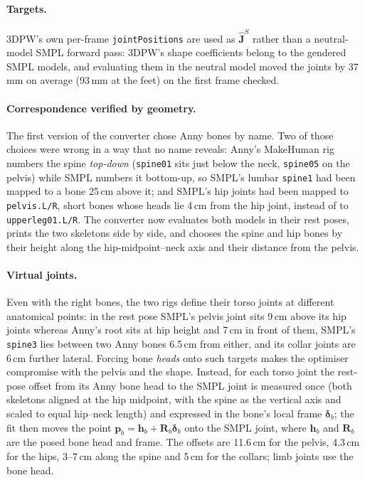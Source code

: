 \paragraph{Targets.} 3DPW's own per-frame \texttt{jointPositions} are used
as $\hat{\mathbf{J}}^{S}$ rather than a neutral-model SMPL forward pass:
3DPW's shape coefficients belong to the gendered SMPL models, and evaluating
them in the neutral model moved the joints by 37\,mm on average (93\,mm at the
feet) on the first frame checked.

\paragraph{Correspondence verified by geometry.} The first version of the
converter chose Anny bones by name. Two of those choices were wrong in a way
that no name reveals: Anny's MakeHuman rig numbers the spine \emph{top-down}
(\texttt{spine01} sits just below the neck, \texttt{spine05} on the pelvis)
while SMPL numbers it bottom-up, so SMPL's lumbar \texttt{spine1} had been
mapped to a bone 25\,cm above it; and SMPL's hip joints had been mapped to
\texttt{pelvis.L/R}, short bones whose heads lie 4\,cm from the hip joint,
instead of to \texttt{upperleg01.L/R}. The converter now evaluates both
models in their rest poses, prints the two skeletons side by side, and
chooses the spine and hip bones by their height along the hip-midpoint--neck
axis and their distance from the pelvis.

\paragraph{Virtual joints.} Even with the right bones, the two rigs define
their torso joints at different anatomical points: in the rest pose SMPL's
pelvis joint sits 9\,cm above its hip joints whereas Anny's root sits at hip
height and 7\,cm in front of them, SMPL's \texttt{spine3} lies between two Anny
bones 6.5\,cm from either, and its collar joints are 6\,cm further lateral.
Forcing bone \emph{heads} onto such targets makes the optimiser compromise
with the pelvis and the shape. Instead, for each torso joint the rest-pose
offset from its Anny bone head to the SMPL joint is measured once (both
skeletons aligned at the hip midpoint, with the spine as the vertical axis
and scaled to equal hip--neck length) and expressed in the bone's local frame
$\boldsymbol{\delta}_b$; the fit then moves the point
$\mathbf{p}_b = \mathbf{h}_b + \mathbf{R}_b\boldsymbol{\delta}_b$ onto the SMPL
joint, where $\mathbf{h}_b$ and $\mathbf{R}_b$ are the posed bone head and
frame. The offsets are 11.6\,cm for the pelvis, 4.3\,cm for the hips, 3--7\,cm
along the spine and 5\,cm for the collars; limb joints use the bone head.

